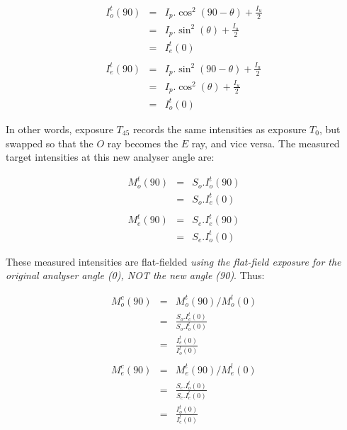 \begin{myquote}
\begin{eqnarray*}
  I^{t}_{o}(90) & = & I_{p}.\cos^{2}( 90 - \theta ) + \frac{I_{u}}{2} \\
                 & = & I_{p}.\sin^{2}( \theta ) + \frac{I_{u}}{2} \\
                 & = & I^{t}_{e}(0) \\ \\
  I^{t}_{e}(90) & = & I_{p}.\sin^{2}( 90 - \theta ) + \frac{I_{u}}{2} \\
                 & = & I_{p}.\cos^{2}( \theta ) + \frac{I_{u}}{2} \\
                 & = & I^{t}_{o}(0) 
\end{eqnarray*}
\end{myquote}

In other words, exposure $T_{45}$ records the same intensities as
exposure $T_{0}$, but swapped so that the $O$ ray becomes the
$E$ ray, and vice versa. The measured target intensities at this new
analyser angle are:

\begin{myquote}
\begin{eqnarray*}
  M^{t}_{o}(90) & = & S_{o}.I^{t}_{o}(90) \\
                    & = & S_{o}.I^{t}_{e}(0) \\ \\
  M^{t}_{e}(90) & = & S_{e}.I^{t}_{e}(90) \\
                    & = & S_{e}.I^{t}_{o}(0) 
\end{eqnarray*}
\end{myquote}

These measured intensities are flat-fielded {\em using the flat-field
exposure for the original analyser angle {\em (0\dgs)}, NOT the new angle
{\em (90\dgs)}}. Thus:

\begin{myquote}
\begin{eqnarray*}
  M^{c}_{o}(90) & = & M^{t}_{o}(90) / M^{l}_{o}(0) \\
                & = & \frac{ S_{o}.I^{t}_{e}(0) }{ S_{o}.I^{l}_{o}(0) } \\
                & = & \frac{ I^{t}_{e}(0) }{ I^{l}_{o}(0) } \\ \\
  M^{c}_{e}(90) & = & M^{t}_{e}(90) / M^{l}_{e}(0) \\
                & = & \frac{ S_{e}.I^{t}_{o}(0) }{ S_{e}.I^{l}_{e}(0) } \\
                & = & \frac{ I^{t}_{o}(0) }{ I^{l}_{e}(0) } 
\end{eqnarray*}
\end{myquote}

